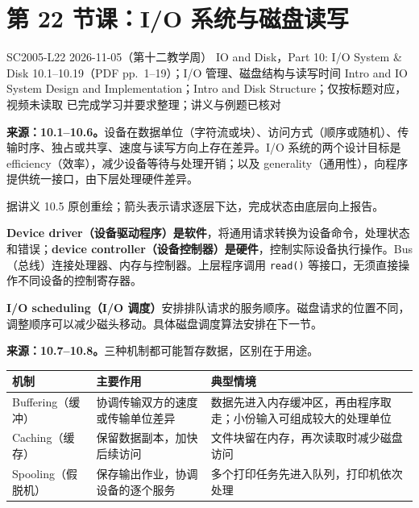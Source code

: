 \begingroup
\renewcommand{\recordid}[1]{}
\renewcommand{\relatedexercise}[2]{\hyperref[exercise:#1]{#2}}
\section{第 22 节课：I/O 系统与磁盘读写}
\label{lecture:SC2005-L22}

\lecturemeta
  {SC2005-L22}
  {2026-11-05（第十二教学周）}
  {IO and Disk，Part 10: I/O System \& Disk}
  {10.1--10.19（PDF pp.~1--19）；I/O 管理、磁盘结构与读写时间}
  {Intro and IO System Design and Implementation；Intro and Disk Structure；仅按标题对应，视频未读取}
  {已完成学习并要求整理；讲义与例题已核对}

\linespread{1.15}\selectfont
\setlength{\parskip}{0.4em}



\textbf{来源：10.1--10.6。}设备在数据单位（字符流或块）、访问方式（顺序或随机）、传输时序、独占或共享、速度与读写方向上存在差异。I/O 系统的两个设计目标是 efficiency（效率），减少设备等待与处理开销；以及 generality（通用性），向程序提供统一接口，由下层处理硬件差异。

\begin{center}


{\small 据讲义 10.5 原创重绘；箭头表示请求逐层下达，完成状态由底层向上报告。}
\end{center}

\textbf{Device driver（设备驱动程序）是软件}，将通用请求转换为设备命令，处理状态和错误；\textbf{device controller（设备控制器）是硬件}，控制实际设备执行操作。Bus（总线）连接处理器、内存与控制器。上层程序调用 \texttt{read()} 等接口，无须直接操作不同设备的控制寄存器。

\textbf{I/O scheduling（I/O 调度）}安排排队请求的服务顺序。磁盘请求的位置不同，调整顺序可以减少磁头移动。具体磁盘调度算法安排在下一节。


\textbf{来源：10.7--10.8。}三种机制都可能暂存数据，区别在于用途。
\begin{center}
\begin{tabularx}{\textwidth}{@{}p{3.15cm}XX@{}}
\toprule
机制 & 主要作用 & 典型情境 \\
\midrule
Buffering（缓冲） & 协调传输双方的速度或传输单位差异 & 数据先进入内存缓冲区，再由程序取走；小份输入可组成较大的处理单位 \\
Caching（缓存） & 保留数据副本，加快后续访问 & 文件块留在内存，再次读取时减少磁盘访问 \\
Spooling（假脱机） & 保存输出作业，协调设备的逐个服务 & 多个打印任务先进入队列，打印机依次处理 \\
\bottomrule
\end{tabularx}
\end{center}

